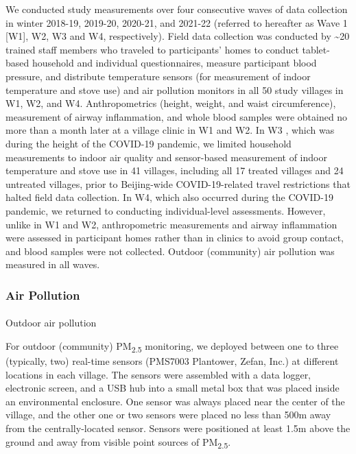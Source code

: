 \documentclass[
  letterpaper,
  DIV=11,
  numbers=noendperiod]{scrartcl}
\makeatletter
\let\oldparagraph\paragraph
\renewcommand{\paragraph}{
    \@ifstar
      \xxxParagraphStar
      \xxxParagraphNoStar
  }
\newcommand{\xxxParagraphStar}[1]{\oldparagraph*{#1}\mbox{}}
\newcommand{\xxxParagraphNoStar}[1]{\oldparagraph{#1}\mbox{}}
\makeatother
\begin{document}
We conducted study measurements over four consecutive waves of data
collection in winter 2018-19, 2019-20, 2020-21, and 2021-22 (referred to
hereafter as Wave 1 {[}W1{]}, W2, W3 and W4, respectively). Field data
collection was conducted by \textasciitilde20 trained staff members who
traveled to participants' homes to conduct tablet-based household and
individual questionnaires, measure participant blood pressure, and
distribute temperature sensors (for measurement of indoor temperature
and stove use) and air pollution monitors in all 50 study villages in
W1, W2, and W4. Anthropometrics (height, weight, and waist
circumference), measurement of airway inflammation, and whole blood
samples were obtained no more than a month later at a village clinic in
W1 and W2. In W3 , which was during the height of the
COVID-19 pandemic, we limited household measurements to indoor air
quality and sensor-based measurement of indoor temperature and stove use
in 41 villages, including all 17 treated villages and 24 untreated
villages, prior to Beijing-wide COVID-19-related travel restrictions
that halted field data collection. In W4, which also occurred during the
COVID-19 pandemic, we returned to conducting individual-level
assessments. However, unlike in W1 and W2, anthropometric measurements
and airway inflammation were assessed in participant homes rather than
in clinics to avoid group contact, and blood samples were not collected.
Outdoor (community) air pollution was measured in all waves.

\subsubsection{Air Pollution}\label{air-pollution}

\paragraph{Outdoor air pollution}\label{outdoor-air-pollution}

For outdoor (community) PM\textsubscript{2.5} monitoring, we deployed
between one to three (typically, two) real-time sensors (PMS7003
Plantower, Zefan, Inc.) at different locations in each
village. The sensors were assembled with a data logger, electronic
screen, and a USB hub into a small metal box that was placed inside an
environmental enclosure. One sensor was always placed near the center of
the village, and the other one or two sensors were placed no less than
500m away from the centrally-located sensor. Sensors were positioned at
least 1.5m above the ground and away from visible point sources of
PM\textsubscript{2.5}.
\end{document}
